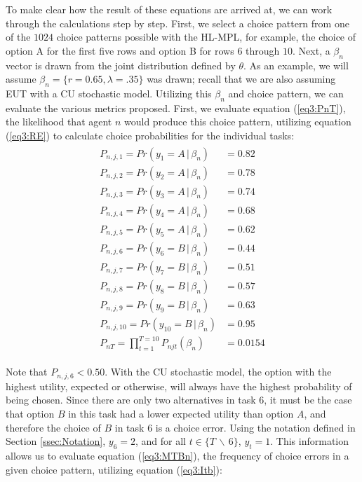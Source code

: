 \documentclass[../main.tex]{subfiles}
\begin{document}
To make clear how the result of these equations are arrived at, we can work through the calculations step by step.
First, we select a choice pattern from one of the $1024$ choice patterns possible with the HL-MPL, for example, the choice of option A for the first five rows and option B for rows $6$ through $10$.
Next, a $\beta_n$ vector is drawn from the joint distribution defined by $\theta$.
As an example, we will assume $\beta_n = \lbrace r = 0.65, \lambda = .35\rbrace$ was drawn; recall that we are also assuming EUT with a CU stochastic model.
Utilizing this $\beta_n$ and choice pattern, we can evaluate the various metrics proposed.
First, we evaluate equation (\ref{eq3:PnT}), the likelihood that agent $n$ would produce this choice pattern, utilizing equation (\ref{eq3:RE}) to calculate choice probabilities for the individual tasks:
\begin{align}
	\label{eq3:example_PnT}
	\begin{split}
		P_{n,j,1}  = Pr(y_1 = A    \,|\, \beta_n)    &= 0.82 \\
		P_{n,j,2}  = Pr(y_2 = A    \,|\, \beta_n)    &= 0.78 \\
		P_{n,j,3}  = Pr(y_3 = A    \,|\, \beta_n)    &= 0.74 \\
		P_{n,j,4}  = Pr(y_4 = A    \,|\, \beta_n)    &= 0.68 \\
		P_{n,j,5}  = Pr(y_5 = A    \,|\, \beta_n)    &= 0.62 \\
		P_{n,j,6}  = Pr(y_6 = B    \,|\, \beta_n)    &= 0.44 \\
		P_{n,j,7}  = Pr(y_7 = B    \,|\, \beta_n)    &= 0.51 \\
		P_{n,j,8}  = Pr(y_8 = B    \,|\, \beta_n)    &= 0.57 \\
		P_{n,j,9}  = Pr(y_9 = B    \,|\, \beta_n)    &= 0.63 \\
		P_{n,j,10} = Pr(y_{10} = B \,|\, \beta_n)    &= 0.95 \\
		P_{nT}     = \prod_{t = 1}^{T = 10} P_{njt}(\beta_n)  &= 0.0154
	\end{split}
\end{align}

\noindent Note that $P_{n,j,6} < 0.50$.
With the CU stochastic model, the option with the highest utility, expected or otherwise, will always have the highest probability of being chosen.
Since there are only two alternatives in task $6$, it must be the case that option $B$ in this task had a lower expected utility than option $A$, and therefore the choice of $B$ in task $6$ is a choice error.
Using the notation defined in Section \ref{ssec:Notation}, $y_6 = 2$, and for all $t \in \lbrace T \,\backslash\, 6 \rbrace$, $y_t = 1$.
This information allows us to evaluate equation (\ref{eq3:MTBn}), the frequency of choice errors in a given choice pattern, utilizing equation (\ref{eq3:Itb}):
\end{document}

